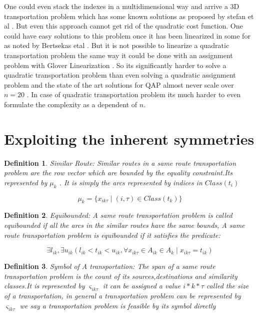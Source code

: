 \documentclass[a4paper]{article}
\newtheorem{definition}{Definition}[section]
\begin{document}
    One could even stack the indexes in a multidimensional way and arrive a 3D transportation problem which has some known solutions as proposed by stefan et al . \cite{Stefan} But even this approach cannot get rid of the quadratic cost function. One could have easy solutions to this problem once it has been linearized in some for as noted by Bertsekas etal \cite{4739098} . But it is not possible to linearize a quadratic  transportation problem the same way it could be done with an assignment problem with Glover Linearization \cite{GUEYE20091255}. So its significantly harder to solve a quadratic transportation problem than even solving a quadratic assignment problem and the state of the art solutions for QAP almost never scale over $n=20$ \cite{BURKARD1991115}. In case of quadratic transportation problem its much harder to even formulate the complexity as a dependent of $n$.
    
        
    \section{Exploiting the inherent symmetries}
    \theoremstyle{definition}
    \begin{definition}{Similar Route:}
    Similar routes in a same route transportation problem are the row vector which are bounded by the equality constraint.Its represented by $\mu_k$ . It is simply the arcs represented by indices in $Class(t_{i})$
    \end{definition}
    
    $$\mu_k = \{x_{ik\tau} \mid (i,\tau) \in Class(t_{k})\}$$
    
    \begin{definition}{Equibounded:}
    A same route transportation problem is called equibounded if all the arcs in the similar routes have the same bounds, A same route transportation problem is equibounded if it satisfies the predicate:
    \end{definition}
    $$\exists l_{ik},\exists u_{ik}(l_{ik}<t_{ik}<u_{ik}, \forall x_{ik\tau} \in A_{ik} \in A_k \mid x_{ik\tau}  =  t_{ik})$$
    
        \begin{definition}{Symbol of A transportation:}
    The span of a same route transportation problem is the count of its sources,destinations and similarity classes.It is represented by $\varsigma_{ik\tau}$ it can be assigned a value $i*k*\tau$ called the size of a transportation, in general a transportation problem can be represented by $\varsigma_{ik\tau}$ we say a transportation problem is feasible by its symbol directly
    \end{definition}
    
\end{document}
